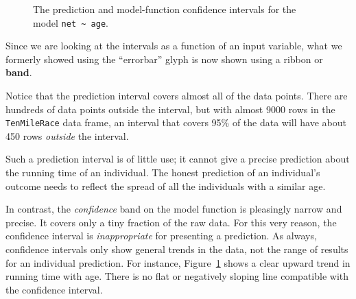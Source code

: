 \documentclass[
  letterpaper,
  DIV=11,
  numbers=noendperiod,
  oneside]{scrreprt}
\begin{document}
\begin{tcolorbox}
\begin{figure}[H]
\begin{minipage}[t]{0.50\linewidth}
{\centering 


}

\end{minipage}%
%
\begin{minipage}[t]{0.50\linewidth}

{\centering 


}

\end{minipage}%

\caption{\label{fig-ten-mile-age-confidence}The prediction and
model-function confidence intervals for the model
\texttt{net\ \textasciitilde{}\ age}.}

\end{figure}

Since we are looking at the intervals as a function of an input
variable, what we formerly showed using the ``errorbar'' glyph is now
shown using a ribbon or \textbf{band}.

\end{tcolorbox}

Notice that the prediction interval covers almost all of the data
points. There are hundreds of data points outside the interval, but with
almost 9000 rows in the \texttt{TenMileRace} data frame, an interval
that covers 95\% of the data will have about 450 rows \emph{outside} the
interval.

Such a prediction interval is of little use; it cannot give a precise
prediction about the running time of an individual. The honest
prediction of an individual's outcome needs to reflect the spread of all
the individuals with a similar age.

In contrast, the \emph{confidence} band on the model function is
pleasingly narrow and precise. It covers only a tiny fraction of the raw
data. For this very reason, the confidence interval is
\emph{inappropriate} for presenting a prediction. As always, confidence
intervals only show general trends in the data, not the range of results
for an individual prediction. For instance,
Figure~\ref{fig-ten-mile-age-confidence} shows a clear upward trend in
running time with age. There is no flat or negatively sloping line
compatible with the confidence interval.
\end{document}
